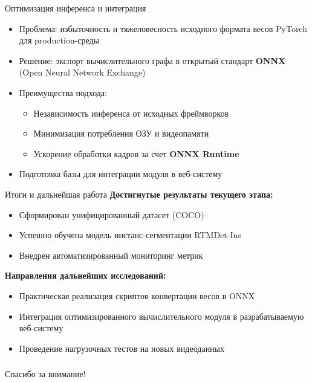 \documentclass[hyperref={unicode}]{beamer}
\begin{document}
\begin{frame}{Оптимизация инференса и интеграция}
\begin{itemize}
    \item Проблема: избыточность и тяжеловесность исходного формата весов PyTorch для production-среды
    \item Решение: экспорт вычислительного графа в открытый стандарт \textbf{ONNX} (Open Neural Network Exchange)
    \item Преимущества подхода:
    \begin{itemize}
        \item Независимость инференса от исходных фреймворков
        \item Минимизация потребления ОЗУ и видеопамяти
        \item Ускорение обработки кадров за счет \textbf{ONNX Runtime}
    \end{itemize}
    \item Подготовка базы для интеграции модуля в веб-систему
\end{itemize}
\end{frame}

\begin{frame}{Итоги и дальнейшая работа}
\textbf{Достигнутые результаты текущего этапа:}
\begin{itemize}
    \item Сформирован унифицированный датасет (COCO)
    \item Успешно обучена модель инстанс-сегментации RTMDet-Ins
    \item Внедрен автоматизированный мониторинг метрик
\end{itemize}

\medskip
\textbf{Направления дальнейших исследований:}
\begin{itemize}
    \item Практическая реализация скриптов конвертации весов в ONNX
    \item Интеграция оптимизированного вычислительного модуля в разрабатываемую веб-систему
    \item Проведение нагрузочных тестов на новых видеоданных
\end{itemize}
\end{frame}

\begin{frame}
  \frametitle{}
  
{\Large\mbox{}\hfil Спасибо за внимание!}
  
\end{frame}
\end{document}
